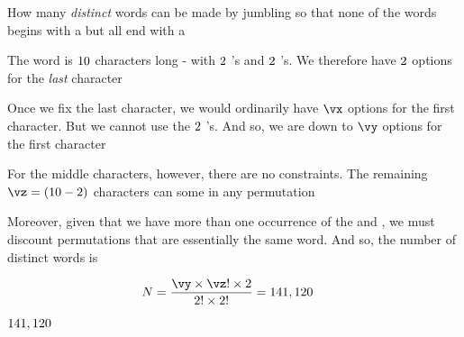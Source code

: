 



\SUBTRACT{}\vx
\SUBTRACT\vx\vd\vy
\SUBTRACT{}\vz

\question[4] How many \textit{distinct} words can be made by jumbling \va so that none of the words
begins with a \vb but all end with a \vc

\watchout[-10pt]

\ifprintanswers
\fi 

\begin{solution}[\halfpage]
	The word is $10$ characters long - with $2$ \vb 's and $2$ \vc 's. We therefore have $2$
	 options for the \textit{last} character
	 
	 Once we fix the last character, we would ordinarily have $\vx$ options for the first character. 
	 But we cannot use the $2$ \vb 's. And so, we are down to $\vy$ options for the first character
	 
	 For the middle characters, however, there are no constraints. The remaining $\vz = (\vf - 2)$ characters 
	 can some in any permutation
	 
	 Moreover, given that we have more than one occurrence of the \vb and \vc, we must discount 
	 permutations that are essentially the same word. And so, the number of distinct words is 
	 
	 \begin{align}
	 	N &= \dfrac{\vy \times \vz ! \times \ve}{\vd ! \times \ve !} = \vg
	 \end{align}
\end{solution}

\ifprintanswers
  \begin{codex}
    $141,120$
  \end{codex}
\fi
